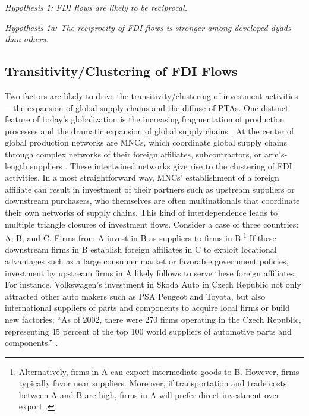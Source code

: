 \documentclass[12pt]{article}
\begin{document}
\textit{Hypothesis 1: FDI flows are likely to be reciprocal.}

\textit{Hypothesis 1a: The reciprocity of FDI flows is stronger among developed dyads than others.}

\subsection{Transitivity/Clustering of FDI Flows}
Two factors are likely to drive the transitivity/clustering of investment activities---the expansion of global supply chains and the diffuse of PTAs.  One distinct feature of today's globalization is the increasing fragmentation of production processes and the dramatic expansion of global supply chains \citep{UNCTAD:2013}. At the center of global production networks are MNCs, which coordinate global supply chains through complex networks of their foreign affiliates, subcontractors, or arm's-length suppliers \citep[xxii]{UNCTAD:2013}. These intertwined networks give rise to the clustering of FDI activities. In a most straightforward way, MNCs' establishment of a foreign affiliate can result in investment of their partners such as upstream suppliers or downstream purchasers, who themselves are often multinationals that coordinate their own networks of supply chains. This kind of interdependence leads to multiple triangle closures of investment flows. Consider a case of three countries: A, B, and C. Firms from A invest in B as suppliers to firms in B.\footnote{Alternatively, firms in A can export intermediate goods to B. However, firms typically favor near suppliers. Moreover, if transportation and trade costs between A and B are high, firms in A will prefer direct investment over export \citep{Carr_et_al:2001}. } If these downstream firms in B establish foreign affiliates in C to exploit locational advantages such as a large consumer market or favorable government policies, investment by upstream firms in A likely follows to serve these foreign affiliates. For instance, Volkswagen's investment in Skoda Auto in Czech Republic not only attracted other auto makers such as PSA Peugeot and Toyota, but also international suppliers of parts and components to acquire local firms or build new factories; ``As of 2002, there were 270 firms operating in the Czech Republic, representing 45 percent of the top 100 world suppliers of automotive parts and components.'' \citep[352]{Kaminski_Javorcik:2005}. 
\end{document}
